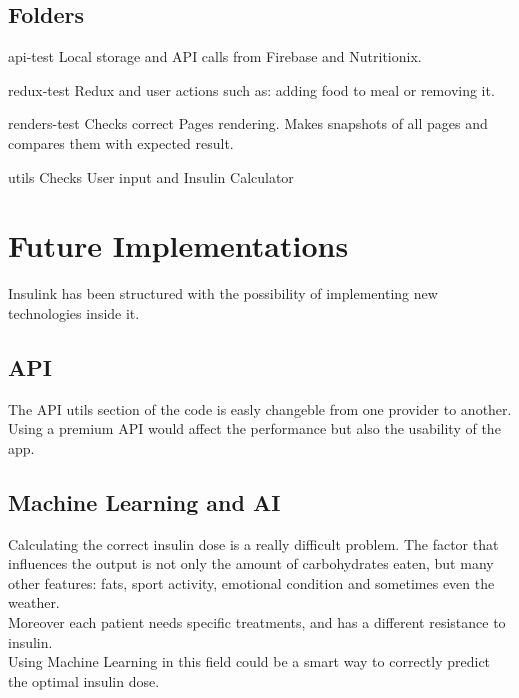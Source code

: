 \documentclass[12pt,hidelinks]{article}
\begin{document}
\subsection{Folders}


\begin{docCommand}{api-test}{}
	Local storage and API calls from Firebase and Nutritionix.
\end{docCommand}

\begin{docCommand}{redux-test}{}
	Redux and user actions such as: adding food to meal or removing it. 
\end{docCommand}

\begin{docCommand}{renders-test}{}
	Checks correct Pages rendering. Makes snapshots of all pages and compares them with expected result.
\end{docCommand}

\begin{docCommand}{utils}{}
   Checks User input and Insulin Calculator 
\end{docCommand}


\newpage
{}
\section{Future Implementations}
\vspace{10.5cm}
Insulink has been structured with the possibility of implementing new technologies inside it.
\subsection{API}
The API utils section of the code is easly changeble from one provider to another. Using a premium API
would affect the performance but also the usability of the app.
\subsection{Machine Learning and AI}
Calculating the correct insulin dose is a really difficult problem. The factor that influences the output is not only the amount of carbohydrates eaten,
but many other features: fats, sport activity, emotional condition and sometimes even the weather.\\
Moreover each patient needs specific treatments, and has a different resistance to insulin.\\
Using Machine Learning in this field could be a smart way to correctly predict the optimal insulin dose. 
\end{document}
